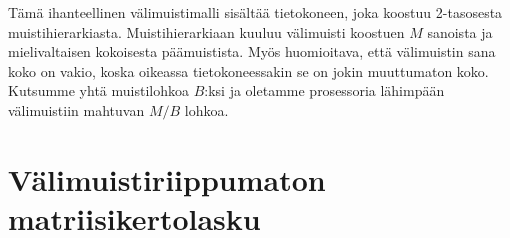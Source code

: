 \documentclass[finnish]{tktltiki2}
\theoremstyle{definition}
\theoremstyle{remark}
\begin{document}
Tämä ihanteellinen välimuistimalli sisältää %
tietokoneen, joka koostuu 2-tasosesta muistihierarkiasta. Muistihierarkiaan
kuuluu välimuisti koostuen $ M $ sanoista ja mielivaltaisen
kokoisesta päämuistista. Myös huomioitava, että välimuistin sana koko on
vakio, koska oikeassa tietokoneessakin se on jokin muuttumaton koko.
Kutsumme yhtä muistilohkoa $ B $:ksi ja oletamme prosessoria lähimpään välimuistiin mahtuvan $ M/B $ lohkoa.


















\section{Välimuistiriippumaton matriisikertolasku}


%
%
% 
%



\end{document}
